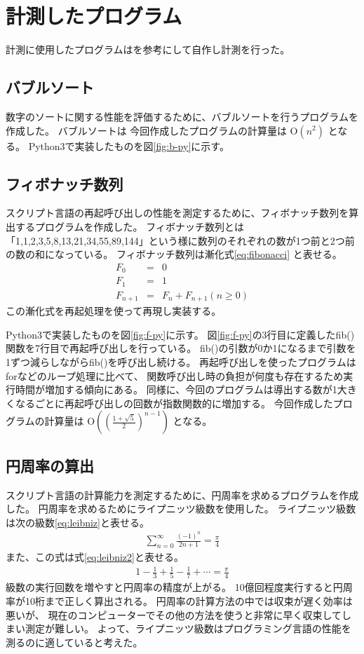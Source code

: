 \chapter{計測したプログラム}
\label{cha:program}
計測に使用したプログラムは\cite{Benchmark}を参考にして自作し計測を行った。
\section{バブルソート}
数字のソートに関する性能を評価するために、バブルソートを行うプログラムを作成した。
バブルソートは
今回作成したプログラムの計算量は O$(n^{2})$ となる。
Python3で実装したものを図\ref{fig:b-py}に示す。
\section{フィボナッチ数列}
スクリプト言語の再起呼び出しの性能を測定するために、フィボナッチ数列を算出するプログラムを作成した。
フィボナッチ数列とは「1,1,2,3,5,8,13,21,34,55,89,144」という様に数列のそれぞれの数が1つ前と2つ前の数の和になっている。
フィボナッチ数列は漸化式\ref{eq:fibonacci} と表せる。
\begin{eqnarray} \label{eq:fibonacci}
  F_{0}&=&0 \nonumber \\
  F_{1}&=&1 \\
  F_{n+1}&=&F_{n}+F_{n+1}(n≥0)\nonumber
\end{eqnarray}
この漸化式を再起処理を使って再現し実装する。

Python3で実装したものを図\ref{fig:f-py}に示す。
図\ref{fig:f-py}の3行目に定義したfib()関数を7行目で再起呼び出しを行っている。
fib()の引数が0か1になるまで引数を1ずつ減らしながらfib()を呼び出し続ける。
再起呼び出しを使ったプログラムはforなどのループ処理に比べて、
関数呼び出し時の負担が何度も存在するため実行時間が増加する傾向にある。
同様に、今回のプログラムは導出する数が1大きくなるごとに再起呼び出しの回数が指数関数的に増加する。
今回作成したプログラムの計算量は O$((\frac{1 +\sqrt{5}}{2})^{n-1})$ となる。

\section{円周率の算出}
スクリプト言語の計算能力を測定するために、円周率を求めるプログラムを作成した。
円周率を求めるためにライプニッツ級数を使用した。
ライプニッツ級数は次の級数\ref{eq:leibniz}と表せる。
\begin{eqnarray} \label{eq:leibniz}
\sum_{n=0}^{\infty}\frac{(-1)^n}{2n+1}=\frac{\pi}{4}
\end{eqnarray}
また、この式は式\ref{eq:leibniz2}と表せる。
\begin{eqnarray} \label{eq:leibniz2}
1-\frac{1}{3}+\frac{1}{5}-\frac{1}{7}+\cdots=\frac{\pi}{4}
\end{eqnarray}
級数の実行回数を増やすと円周率の精度が上がる。
10億回程度実行すると円周率が10桁まで正しく算出される。
円周率の計算方法の中では収束が遅く効率は悪いが、
現在のコンピューターでその他の方法を使うと非常に早く収束してしまい測定が難しい。
よって、ライプニッツ級数はプログラミング言語の性能を測るのに適していると考えた。

